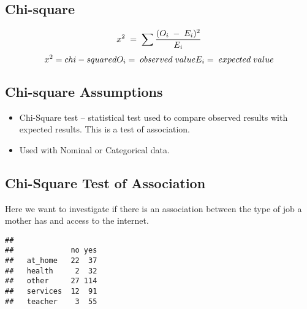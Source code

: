 \documentclass[
]{book}
\newenvironment{Shaded}{\begin{snugshade}}{\end{snugshade}}
\newcommand{\FunctionTok}[1]{\textcolor[rgb]{0.13,0.29,0.53}{\textbf{#1}}}
\newcommand{\NormalTok}[1]{#1}
\newcommand{\OtherTok}[1]{\textcolor[rgb]{0.56,0.35,0.01}{#1}}
\newcommand{\SpecialCharTok}[1]{\textcolor[rgb]{0.81,0.36,0.00}{\textbf{#1}}}
\providecommand{\tightlist}{%
  \setlength{\itemsep}{0pt}\setlength{\parskip}{0pt}}
\theoremstyle{definition}
\theoremstyle{definition}
\theoremstyle{definition}
\theoremstyle{definition}
\theoremstyle{remark}
\begin{document}
\hypertarget{chi-square}{%
\subsection{Chi-square}\label{chi-square}}

\[
x^2\;=\;\sum\frac{(O_{i}\;-\;E_{i})^2}{E_{i}}
\\
\\
\]
\[
x^2 = chi-squared\\
O_{i}=\;observed\;value
\\
E_{i}=\;expected\;value
\]

\hypertarget{chi-square-assumptions-1}{%
\subsection{Chi-square Assumptions}\label{chi-square-assumptions-1}}

\begin{itemize}
\tightlist
\item
  Chi-Square test -- statistical test used to compare observed results with expected results. This is a test of association.
\item
  Used with Nominal or Categorical data.
\end{itemize}

\hypertarget{chi-square-test-of-association}{%
\subsection{Chi-Square Test of Association}\label{chi-square-test-of-association}}

Here we want to investigate if there is an association between the type of job a mother has and access to the internet.

\begin{Shaded}
\end{Shaded}

\begin{verbatim}
##           
##             no yes
##   at_home   22  37
##   health     2  32
##   other     27 114
##   services  12  91
##   teacher    3  55
\end{verbatim}
\end{document}
